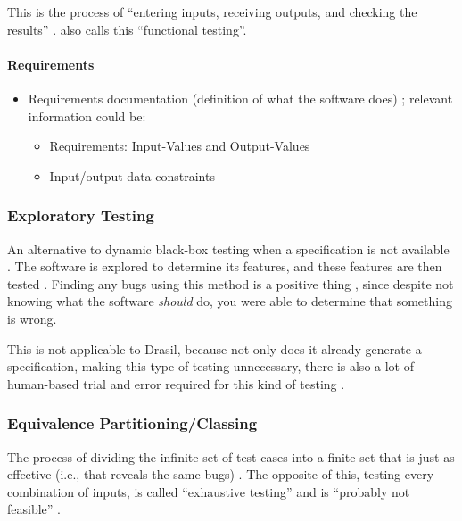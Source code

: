 This is the process of ``entering inputs, receiving outputs, and checking the
results'' \cite[p.~64]{patton_software_2006}. \cite{van_vliet_software_2000}
also calls this ``functional testing''.

\paragraph{Requirements}
\begin{itemize}
      \item Requirements documentation (definition of what the software does)
            \cite[p.~64]{patton_software_2006}; relevant information could be:
            \begin{itemize}
                  \item Requirements: Input-Values and Output-Values
                  \item Input/output data constraints
            \end{itemize}
\end{itemize}

\subsubsection{Exploratory Testing \cite[p.~65]{patton_software_2006}}

An alternative to dynamic black-box testing when a specification is not
available \cite[p.~65]{patton_software_2006}. The software is explored to
determine its features, and these features are then tested
\cite[p.~65]{patton_software_2006}. Finding any bugs using this method is a
positive thing \cite[p.~65]{patton_software_2006}, since despite not knowing
what the software \emph{should} do, you were able to determine that something
is wrong.

This is not applicable to Drasil, because not only does it already generate a
specification, making this type of testing unnecessary, there is also a lot of
human-based trial and error required for this kind of testing
\cite{june_11_meeting}.

\subsubsection{Equivalence Partitioning/Classing \cite[pp.~67-69]{patton_software_2006}}

The process of dividing the infinite set of test cases into a finite set that is
just as effective (i.e., that reveals the same bugs) \cite[p.~67]{patton_software_2006}.
The opposite of this, testing every combination of inputs, is called
``exhaustive testing'' and is ``probably not feasible''
\cite[p.~461]{peters_software_2000}.

